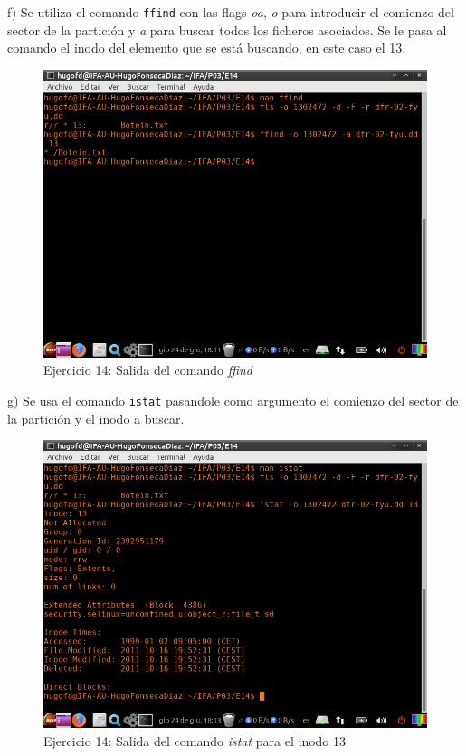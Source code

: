 \documentclass[11pt]{article}
\begin{document}
f) Se utiliza el comando \verb|ffind| con las flags \textit{oa}, \textit{o} para introducir el comienzo del sector de la partición y \textit{a} para buscar todos los ficheros asociados. Se le pasa al comando el inodo del elemento que se está buscando, en este caso el 13.

\begin{figure}[H]
    \caption{Ejercicio 14: Salida del comando \textit{ffind}}
    \centering
    \includegraphics[scale=0.7]{e14-5.png}
\end{figure}

g) Se usa el comando \verb|istat| pasandole como argumento el comienzo del sector de la partición y el inodo a buscar.

\begin{figure}[H]
    \caption{Ejercicio 14: Salida del comando \textit{istat} para el inodo 13}
    \centering
    \includegraphics[scale=0.7]{e14-6.png}
\end{figure}
\end{document}
